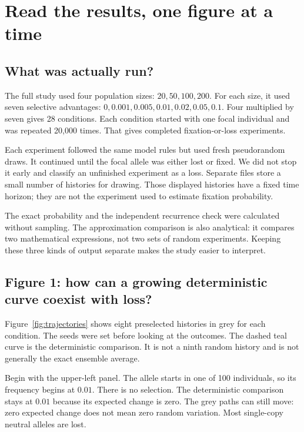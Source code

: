 \chapter{Read the results, one figure at a time}
\label{chap:results}


\section{What was actually run?}
The full study used four population sizes: \(20,50,100,200\). For each size, it used seven selective advantages: \(0,0.001,0.005,0.01,0.02,0.05,0.1\). Four multiplied by seven gives 28 conditions. Each condition started with one focal individual and was repeated 20,000 times. That gives \StudyRepetitions{} completed fixation-or-loss experiments.

Each experiment followed the same model rules but used fresh pseudorandom draws. It continued until the focal allele was either lost or fixed. We did not stop it early and classify an unfinished experiment as a loss. Separate files store a small number of histories for drawing. Those displayed histories have a fixed time horizon; they are not the experiment used to estimate fixation probability.

The exact probability and the independent recurrence check were calculated without sampling. The approximation comparison is also analytical: it compares two mathematical expressions, not two sets of random experiments. Keeping these three kinds of output separate makes the study easier to interpret.

\section{Figure 1: how can a growing deterministic curve coexist with loss?}
Figure~\ref{fig:trajectories} shows eight preselected histories in grey for each condition. The seeds were set before looking at the outcomes. The dashed teal curve is the deterministic comparison. It is not a ninth random history and is not generally the exact ensemble average.

Begin with the upper-left panel. The allele starts in one of 100 individuals, so its frequency begins at \(0.01\). There is no selection. The deterministic comparison stays at \(0.01\) because its expected change is zero. The grey paths can still move: zero expected change does not mean zero random variation. Most single-copy neutral alleles are lost.

